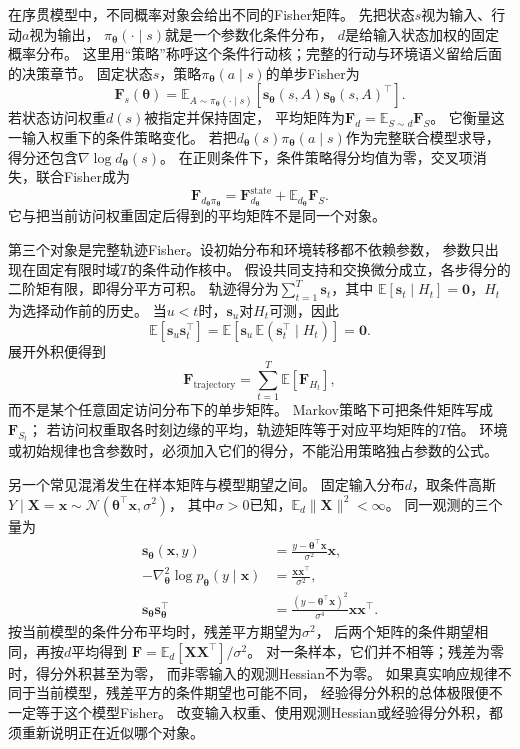 在序贯模型中，不同概率对象会给出不同的Fisher矩阵。
先把状态\(s\)视为输入、行动\(a\)视为输出，
\(\pi_{\bm\theta}(\cdot\mid s)\)就是一个参数化条件分布，
\(d\)是给输入状态加权的固定概率分布。
这里用“策略”称呼这个条件行动核；完整的行动与环境语义留给后面的决策章节。
固定状态\(s\)，策略\(\pi_{\bm\theta}(a\mid s)\)的单步Fisher为
\[
  \bm F_s(\bm\theta)
  =\mathbb E_{A\sim\pi_{\bm\theta}(\cdot\mid s)}
    [\bm s_{\bm\theta}(s,A)\bm s_{\bm\theta}(s,A)^\top].
\]
若状态访问权重\(d(s)\)被指定并保持固定，
平均矩阵为\(\bm F_d=\mathbb E_{S\sim d}\bm F_S\)。
它衡量这一输入权重下的条件策略变化。
若把\(d_{\bm\theta}(s)\pi_{\bm\theta}(a\mid s)\)作为完整联合模型求导，
得分还包含\(\nabla\log d_{\bm\theta}(s)\)。
在正则条件下，条件策略得分均值为零，交叉项消失，联合Fisher成为
\[
  \bm F_{d_{\bm\theta}\pi_{\bm\theta}}
  =\bm F_{d_{\bm\theta}}^{\mathrm{state}}
    +\mathbb E_{d_{\bm\theta}}\bm F_S.
\]
它与把当前访问权重固定后得到的平均矩阵不是同一个对象。

第三个对象是完整轨迹Fisher。设初始分布和环境转移都不依赖参数，
参数只出现在固定有限时域\(T\)的条件动作核中。
假设共同支持和交换微分成立，各步得分的二阶矩有限，即得分平方可积。
轨迹得分为\(\sum_{t=1}^T\bm s_t\)，其中
\(\mathbb E[\bm s_t\mid H_t]=\bm0\)，\(H_t\)为选择动作前的历史。
当\(u<t\)时，\(\bm s_u\)对\(H_t\)可测，因此
\[
  \mathbb E[\bm s_u\bm s_t^\top]
  =\mathbb E[\bm s_u\,\mathbb E(\bm s_t^\top\mid H_t)]=\bm0.
\]
展开外积便得到
\[
  \bm F_{\mathrm{trajectory}}
  =\sum_{t=1}^T\mathbb E[\bm F_{H_t}],
\]
而不是某个任意固定访问分布下的单步矩阵。
Markov策略下可把条件矩阵写成\(\bm F_{S_t}\)；
若访问权重取各时刻边缘的平均，轨迹矩阵等于对应平均矩阵的\(T\)倍。
环境或初始规律也含参数时，必须加入它们的得分，不能沿用策略独占参数的公式。

另一个常见混淆发生在样本矩阵与模型期望之间。
固定输入分布\(d\)，取条件高斯
\(Y\mid\bm X=\bm x\sim\mathcal N(\bm\theta^\top\bm x,\sigma^2)\)，
其中\(\sigma>0\)已知，\(\mathbb E_d\|\bm X\|^2<\infty\)。
同一观测的三个量为
\[
\begin{aligned}
  \bm s_{\bm\theta}(\bm x,y)
    &=\frac{y-\bm\theta^\top\bm x}{\sigma^2}\bm x,\\
  -\nabla^2_{\bm\theta}\log p_{\bm\theta}(y\mid\bm x)
    &=\frac{\bm x\bm x^\top}{\sigma^2},\\
  \bm s_{\bm\theta}\bm s_{\bm\theta}^\top
    &=\frac{(y-\bm\theta^\top\bm x)^2}{\sigma^4}\bm x\bm x^\top.
\end{aligned}
\]
按当前模型的条件分布平均时，残差平方期望为\(\sigma^2\)，
后两个矩阵的条件期望相同，再按\(d\)平均得到
\(\bm F=\mathbb E_d[\bm X\bm X^\top]/\sigma^2\)。
对一条样本，它们并不相等；残差为零时，得分外积甚至为零，
而非零输入的观测Hessian不为零。
如果真实响应规律不同于当前模型，残差平方的条件期望也可能不同，
经验得分外积的总体极限便不一定等于这个模型Fisher。
改变输入权重、使用观测Hessian或经验得分外积，都须重新说明正在近似哪个对象。

